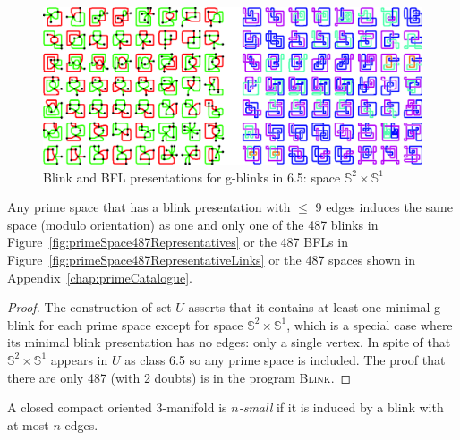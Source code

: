 \begin{figure}[h!tp]
   \begin{center}
      \leavevmode
      \includegraphics[width=14cm]{A.figs/gblinksfors1xs2inu.eps}
   \end{center}
   \vspace{-0.7cm}
   \caption{ Blink and BFL presentations for g-blinks in 6.5: space $\mathbb{S}^2 \times \mathbb{S}^1$}
   \label{fig:gblinksForS1xS2inU}
\end{figure}


\begin{theorem}
\label{theo:primeSpacesUpTo9Edges}
Any prime space that has a blink presentation with $\leq$ 9 edges induces the
same space (modulo orientation) as one and only one of the 487 blinks in
Figure~\ref{fig:primeSpace487Representatives} or the 487 BFLs in
Figure~\ref{fig:primeSpace487RepresentativeLinks} or the 487 spaces shown
in Appendix~\ref{chap:primeCatalogue}.
\end{theorem}

\enlargethispage{2cm}

\begin{proof}
The construction of set $U$ asserts that it contains at least one minimal
g-blink for each prime space except for space $\mathbb{S}^2 \times \mathbb{S}^1$,
which is a special case where its minimal blink presentation
has no edges: only a single vertex. In spite of that $\mathbb{S}^2 \times \mathbb{S}^1$
appears in $U$ as class 6.5 so any prime space is included. The proof
that there are only 487 (with 2 doubts) is in the program \textsc{Blink}.
\end{proof}

A closed compact oriented 3-manifold is {\em $n$-small} if it is induced by a blink with
at most $n$ edges.

\newpage

